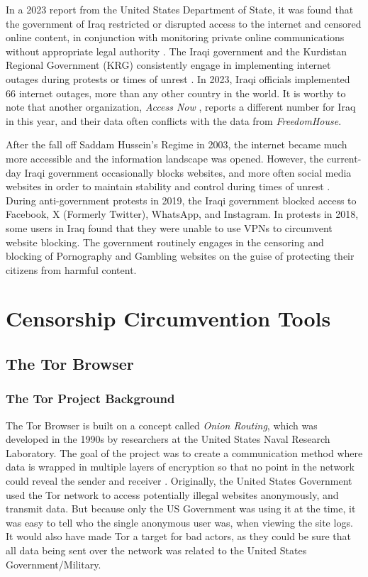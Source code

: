 In a 2023 report from the United States Department of State, it was found that the government of Iraq restricted or disrupted access to the internet and censored online content, in conjunction with monitoring private online communications without appropriate legal authority \cite{USDoSIraq2023}. The Iraqi government and the Kurdistan Regional Government (KRG) consistently engage in implementing internet outages during protests or times of unrest \cite{freedomhouseIraqFreedom}. In 2023, Iraqi officials implemented 66 internet outages, more than any other country in the world. It is worthy to note that another organization, \textit{Access Now} \cite{accessnowBlackoutReport2023}, reports a different number for Iraq in this year, and their data often conflicts with the data from \textit{FreedomHouse}.  

After the fall off Saddam Hussein's Regime in 2003, the internet became much more accessible and the information landscape was opened. However, the current-day Iraqi government occasionally blocks websites, and more often social media websites in order to maintain stability and control during times of unrest \cite{freedomhouseIraqFreedom}. During anti-government protests in 2019, the Iraqi government blocked access to Facebook, X (Formerly Twitter), WhatsApp, and Instagram. In protests in 2018, some users in Iraq found that they were unable to use VPNs to circumvent website blocking. The government routinely engages in the censoring and blocking of Pornography and Gambling websites on the guise of protecting their citizens from harmful content. 

\section{Censorship Circumvention Tools}

\subsection{The Tor Browser}

\subsubsection{The Tor Project Background}

The Tor Browser is built on a concept called \textit{Onion Routing}, which was developed in the 1990s by researchers at the United States Naval Research Laboratory. The goal of the project was to create a communication method where data is wrapped in multiple layers of encryption so that no point in the network could reveal the sender and receiver \cite{torprojectProjectPrivacy}. Originally, the United States Government used the Tor network to access potentially illegal websites anonymously, and transmit data. But because only the US Government was using it at the time, it was easy to tell who the single anonymous user was, when viewing the site logs. It would also have made Tor a target for bad actors, as they could be sure that all data being sent over the network was related to the United States Government/Military.


